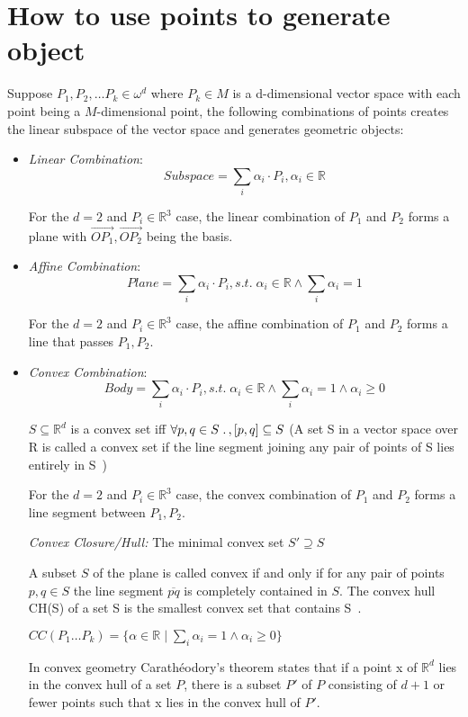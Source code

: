 \documentclass[12pt]{article}
\begin{document}
\section{How to use points to generate object}
Suppose $P_1, P_2, \dots P_k \in \omega^d$ where $P_k \in M$ is a
d-dimensional vector space with each point being a $M$-dimensional
point, the following combinations of points creates the linear
subspace of the vector space and generates geometric objects:
\begin{itemize}
\item \emph{Linear Combination}: 
$$Subspace = \sum_{i} \alpha_i \cdot P_i, \alpha_i \in \mathbb{R}$$ 

For the $d = 2$ and $P_i \in \mathbb{R}^3$ case, the linear
combination of $P_1$ and $P_2$ forms a plane with
$\vec{OP_1}, \vec{OP_2}$ being the basis.

\item \emph{Affine Combination}: 
$$Plane = \sum_{i} \alpha_i \cdot P_i, s.t. \; \alpha_i \in \mathbb{R} \land
\sum_{i} \alpha_i = 1$$ 

For the $d = 2$ and $P_i \in \mathbb{R}^3$ case, the affine
combination of $P_1$ and $P_2$ forms a line that passes $P_1, P_2$.

\item \emph{Convex Combination}: 
$$Body = \sum_{i} \alpha_i \cdot P_i, s.t. \; \alpha_i \in \mathbb{R} \land
\sum_{i} \alpha_i = 1 \land \alpha_i \geq 0$$

$S \subseteq \mathbb{R}^d$ is a convex set iff
$\forall p, q \in S \;\ldotp, [p, q] \subseteq S$ (A set S in a vector
space over R is called a convex set if the line segment joining any
pair of points of S lies entirely in S~\cite{convexSetWA})

For the $d = 2$ and $P_i \in \mathbb{R}^3$ case, the convex
combination of $P_1$ and $P_2$ forms a line segment between
$P_1, P_2$.

\emph{Convex Closure/Hull: } The minimal convex set $S' \supseteq S$ 

A subset $S$ of the plane is called convex if and only if for any pair
of points $p, q \in S$ the line segment $\overline{pq}$ is completely
contained in $S$. The convex hull CH(S) of a set S is the smallest
convex set that contains S~\cite{CG2008}.

\begin{theorem}
  $CC(P_1 \dots P_k) = \{\alpha \in \mathbb{R} \mid \sum_{i} \alpha_i
  = 1 \land \alpha_i \geq 0\}$

  In convex geometry Carathéodory's theorem states that if a point x
  of $\mathbb{R}^d$ lies in the convex hull of a set $P$, there is a
  subset $P'$ of $P$ consisting of $d + 1$ or fewer points such that x
  lies in the convex hull of $P'$.

\end{theorem}
\end{itemize}
\end{document}

